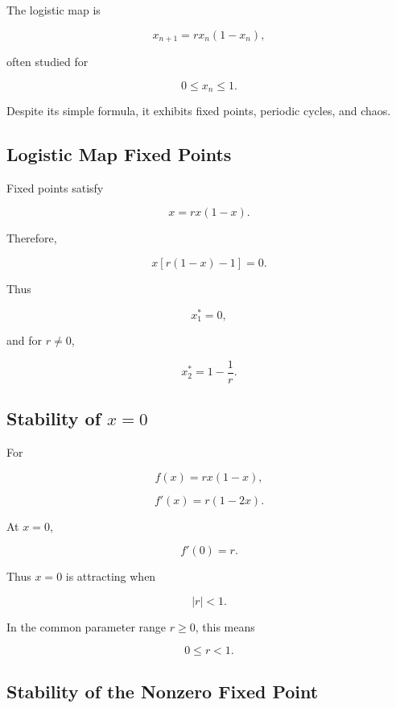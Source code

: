 The logistic map is

\[
\boxed{
x_{n+1}
=
rx_n(1-x_n),
}
\]

often studied for

\[
\boxed{
0\leq x_n\leq1.
}
\]

Despite its simple formula, it exhibits fixed points, periodic cycles, and
chaos.

\subsection{Logistic Map Fixed Points}
\label{subsec:logistic-map-fixed-points}

Fixed points satisfy

\[
x
=
rx(1-x).
\]

Therefore,

\[
x
[
r(1-x)-1
]
=
0.
\]

Thus

\[
\boxed{
x^*_1=0,
}
\]

and for \(r\neq0\),

\[
\boxed{
x^*_2
=
1-\frac1r.
}
\]

\subsection{Stability of \(x=0\)}
\label{subsec:logistic-map-zero-stability}

For

\[
f(x)=rx(1-x),
\]

\[
\boxed{
f'(x)
=
r(1-2x).
}
\]

At \(x=0\),

\[
f'(0)=r.
\]

Thus \(x=0\) is attracting when

\[
\boxed{
|r|<1.
}
\]

In the common parameter range \(r\geq0\), this means

\[
0\leq r<1.
\]

\subsection{Stability of the Nonzero Fixed Point}
\label{subsec:logistic-nonzero-stability}

